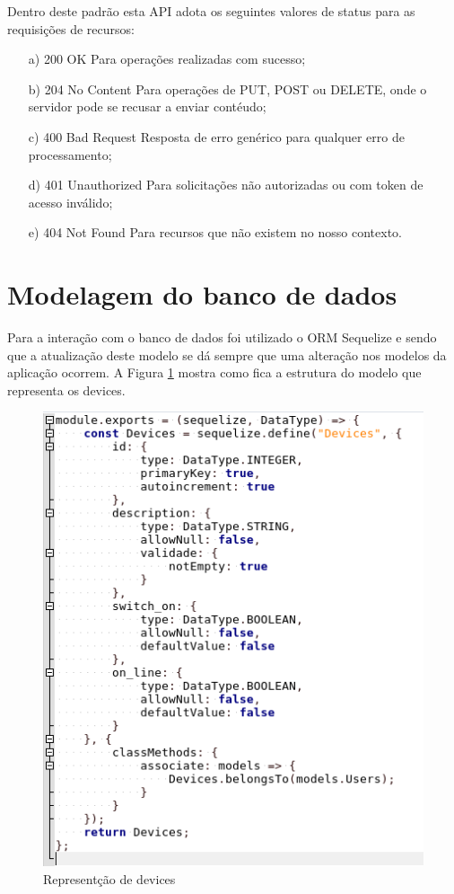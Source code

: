 Dentro deste padrão esta API adota os seguintes valores de status para as requisições de recursos:

\begin{itemize}
    \item [a)] 200 OK Para operações realizadas com sucesso;
    \item [b)] 204 No Content Para operações de PUT, POST ou DELETE, onde o servidor pode se recusar a enviar contéudo;
    \item [c)] 400 Bad Request Resposta de erro genérico para qualquer erro de processamento;
    \item [d)] 401 Unauthorized Para solicitações não autorizadas ou com token de acesso inválido;
    \item [e)] 404 Not Found Para recursos que não existem no nosso contexto.
\end{itemize}

\section{Modelagem do banco de dados}
Para a interação com o banco de dados foi utilizado o ORM Sequelize e sendo que a atualização deste modelo se dá sempre que uma alteração nos modelos da aplicação ocorrem. A Figura \ref{doc-devices} mostra como fica a estrutura do modelo que representa os devices.

\begin{figure}[H]
\caption{\label{doc-devices} Representção de devices}
\includegraphics[scale=0.5]{img/devices-doc.png}
\end{figure}

